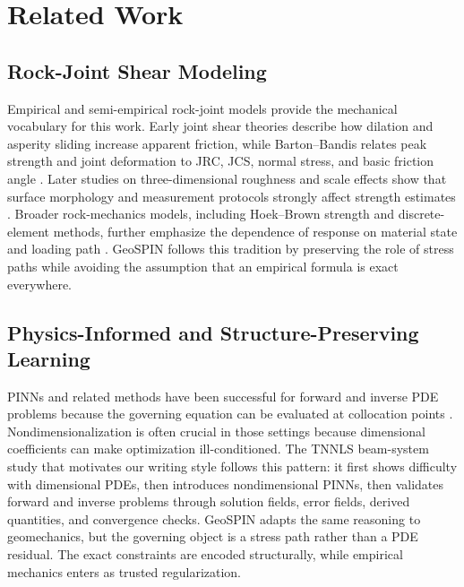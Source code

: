 \documentclass[journal]{IEEEtran}
\begin{document}
\section{Related Work}
\subsection{Rock-Joint Shear Modeling}
Empirical and semi-empirical rock-joint models provide the mechanical vocabulary for this work. Early joint shear theories describe how dilation and asperity sliding increase apparent friction, while Barton--Bandis relates peak strength and joint deformation to JRC, JCS, normal stress, and basic friction angle \cite{barton1973review,barton1977shear,bandis1983fundamentals,barton1985strength}. Later studies on three-dimensional roughness and scale effects show that surface morphology and measurement protocols strongly affect strength estimates \cite{grasselli2003constitutive,tatone2010comparison}. Broader rock-mechanics models, including Hoek--Brown strength and discrete-element methods, further emphasize the dependence of response on material state and loading path \cite{cundall1979discrete,hoek1997practical,jaeger2007fundamentals}. GeoSPIN follows this tradition by preserving the role of stress paths while avoiding the assumption that an empirical formula is exact everywhere.

\subsection{Physics-Informed and Structure-Preserving Learning}
PINNs and related methods have been successful for forward and inverse PDE problems because the governing equation can be evaluated at collocation points \cite{raissi2019physics,karniadakis2021physics,lu2021deepxde}. Nondimensionalization is often crucial in those settings because dimensional coefficients can make optimization ill-conditioned. The TNNLS beam-system study that motivates our writing style follows this pattern: it first shows difficulty with dimensional PDEs, then introduces nondimensional PINNs, then validates forward and inverse problems through solution fields, error fields, derived quantities, and convergence checks. GeoSPIN adapts the same reasoning to geomechanics, but the governing object is a stress path rather than a PDE residual. The exact constraints are encoded structurally, while empirical mechanics enters as trusted regularization.
\end{document}
